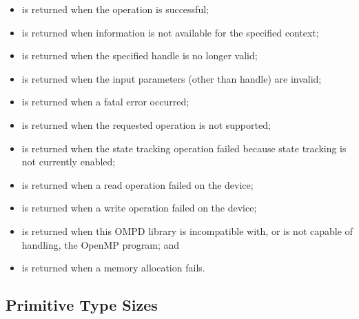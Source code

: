 \begin{itemize}
\label{ompd:ompd_rc_ok}
\item {} is returned when the operation is successful;

\label{ompd:ompd_rc_unavailable}
\item {} is returned when information is not 
      available for the specified context;

\label{ompd:ompd_rc_stale_handle}
\item {} is returned when the specified handle 
      is no longer valid;

\label{ompd:ompd_rc_bad_input}
\item {} is returned when the input parameters 
      (other than handle) are invalid;

\label{ompd:ompd_rc_error}
\item {} is returned when a fatal error occurred;

\label{ompd:ompd_rc_unsupported}
\item {} is returned when the requested 
      operation is not supported;

\label{ompd:ompd_rc_needs_state_tracking}
\item {} is returned when the state 
      tracking operation failed because state tracking is not currently enabled;

\label{ompd:ompd_rc_device_read_error}
\item {} is returned when a read operation 
      failed on the device;

\label{ompd:ompd_rc_device_write_error}
\item {} is returned when a write operation 
      failed on the device;

\label{ompd:ompd_rc_incompatible}
\item {} is returned when this OMPD library is
      incompatible with, or is not capable of handling, the OpenMP program; and

\label{ompd:ompd_rc_nomem}
\item {} is returned when a memory allocation fails.
\end{itemize}



\subsection{Primitive Type Sizes}
\label{subsubsec:ompd_device_type_sizes_t}

